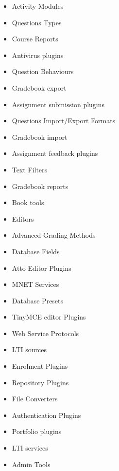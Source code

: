 \newcommand{\plugin}[2]{\item #1 }

\begin{itemize}
        \plugin{Activity Modules}{%
      }

    \plugin{Questions Types}{%
      }

    \plugin{Course Reports}{%
      }

    \plugin{Antivirus plugins}{%
      }

    \plugin{Question Behaviours}{%
      }

    \plugin{Gradebook export}{%
      }

    \plugin{Assignment submission plugins}{%
      }

    \plugin{Questions Import/Export Formats}{%
      }

    \plugin{Gradebook import}{%
      }

    \plugin{Assignment feedback plugins}{%
      }

    \plugin{Text Filters}{%
      }

    \plugin{Gradebook reports}{%
      }

    \plugin{Book tools}{%
      }

    \plugin{Editors}{%
      }

    \plugin{Advanced Grading Methods}{%
      }

    \plugin{Database Fields}{%
      }

    \plugin{Atto Editor Plugins}{%
      }

    \plugin{MNET Services}{%
      }

    \plugin{Database Presets}{%
      }

    \plugin{TinyMCE editor Plugins}{%
      }

    \plugin{Web Service Protocols}{%
      }

    \plugin{LTI sources}{%
      }

    \plugin{Enrolment Plugins}{%
      }

    \plugin{Repository Plugins}{%
      }

    \plugin{File Converters}{%
      }

    \plugin{Authentication Plugins}{%
      }

    \plugin{Portfolio plugins}{%
      }

    \plugin{LTI services}{%
      }

    \plugin{Admin Tools}{%
      }


\end{itemize}
